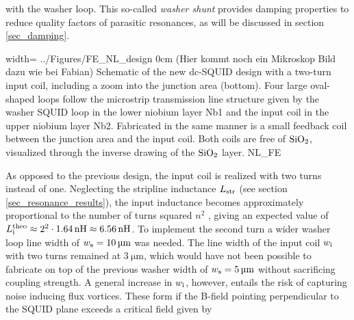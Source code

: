 with the washer loop. This so-called \textit{washer shunt} provides damping properties to reduce quality factors of parasitic resonances, as will be discussed in section \ref{sec_damping}. 

{width=\textwidth}
{../Figures/FE_NL_design}
{0cm}
{(Hier kommt noch ein Mikroskop Bild dazu wie bei Fabian) Schematic of the new dc-SQUID design with a two-turn input coil, including a zoom into the junction area (bottom). Four large oval-shaped loops follow the microstrip transmission line structure given by the washer SQUID loop in the lower niobium layer Nb1 and the input coil in the upper niobium layer Nb2. Fabricated in the same manner is a small feedback coil between the junction area and the input coil. Both coils are free of $\rm{SiO_2}$, visualized through the inverse drawing of the $\rm{SiO_2}$ layer.} 
{NL_FE}

As opposed to the previous design, the input coil is realized with two turns instead of one. Neglecting the stripline inductance $L_{\rm str}$ (see section \ref{sec_resonance_results}), the input inductance becomes approximately proportional to the number of turns squared $n^2$ \cite{Ketchen1981,Jaycox1981}, giving an expected value of $L_{\rm i}^{\rm theo}\approx2^{2}\cdot \qty{1.64}{\nano\henry}\approx\qty{6.56}{\nano\henry}$. To implement the second turn a wider washer loop line width of $w_{\rm s}=\qty{10}{\micro\meter}$ was needed. The line width of the input coil $w_{\rm i}$ with two turns remained at $\qty{3}{\micro\meter}$, which would have not been possible to fabricate on top of the previous washer width of $w_{\rm s}=\qty{5}{\micro\meter}$ without sacrificing coupling strength. A general increase in $w_{\rm i}$, however, entails the risk of capturing noise inducing flux vortices. These form if the B-field pointing perpendicular to the SQUID plane exceeds a critical field given by \cite{Kuit2008} 


